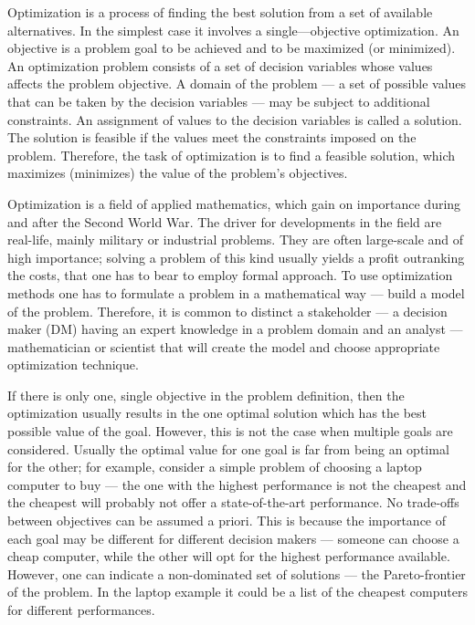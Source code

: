 Optimization is a process of finding the best solution from a set of available
alternatives. In the simplest case it involves a single---objective
optimization. An objective is a problem goal to be achieved and to be
maximized (or minimized). An optimization problem consists of a set of
decision variables whose values affects the problem objective. A domain of the
problem --- a set of possible values that can be taken by the decision
variables --- may be subject to additional constraints. An assignment of
values to the decision variables is called a solution. The solution is
feasible if the values meet the constraints imposed on the problem. Therefore,
the task of optimization is to find a feasible solution, which maximizes
(minimizes) the value of the problem's objectives.

Optimization is a field of applied mathematics, which gain on importance
during and after the Second World War. The driver for developments in the
field are real-life, mainly military or industrial problems. They are often
large-scale and of high importance; solving a problem of this kind usually
yields a profit outranking the costs, that one has to bear to employ formal
approach. To use optimization methods one has to formulate a problem in a
mathematical way --- build a model of the problem. Therefore, it is common to
distinct a stakeholder --- a decision maker (DM) having an expert knowledge in
a problem domain and an analyst --- mathematician or scientist that will
create the model and choose appropriate optimization technique.

If there is only one, single objective in the problem definition, then the
optimization usually results in the one optimal solution which has the best
possible value of the goal. However, this is not the case when multiple goals
are considered. Usually the optimal value for one goal is far from being an
optimal for the other; for example, consider a simple problem of choosing a
laptop computer to buy --- the one with the highest performance is not the
cheapest and the cheapest will probably not offer a state-of-the-art
performance. No trade-offs between objectives can be assumed a priori. This is
because the importance of each goal may be different for different decision
makers --- someone can choose a cheap computer, while the other will opt for
the highest performance available. However, one can indicate a non-dominated
set of solutions --- the Pareto-frontier of the problem. In the laptop example
it could be a list of the cheapest computers for different performances.

